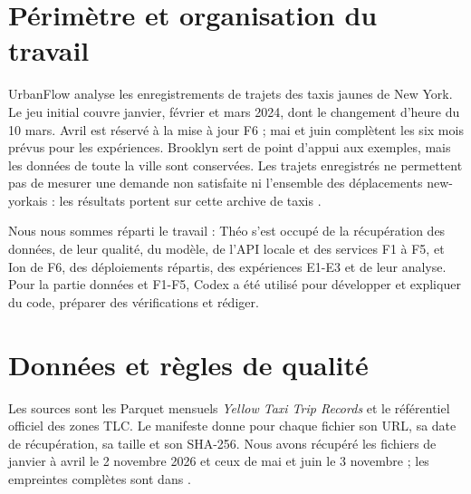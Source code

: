 \section{Périmètre et organisation du travail}
UrbanFlow analyse les enregistrements de trajets des taxis jaunes de New York.
Le jeu initial couvre janvier, février et mars 2024, dont le changement d'heure
du 10 mars. Avril est réservé à la mise à jour F6 ; mai et juin complètent les
six mois prévus pour les expériences. Brooklyn sert de point d'appui aux exemples,
mais les données de toute la ville sont conservées. Les trajets enregistrés ne
permettent pas de mesurer une demande non satisfaite ni l'ensemble des déplacements
new-yorkais : les résultats portent sur cette archive de taxis \cite{sujet}.

Nous nous sommes réparti le travail : Théo s'est occupé de la récupération des données, de leur qualité, du modèle, de l'API locale et des services F1 à F5, et Ion de F6, des déploiements répartis, des expériences E1-E3 et de leur analyse. Pour la partie données et F1-F5, 
Codex a été utilisé pour développer et expliquer du code, préparer des vérifications et
rédiger. 



\section{Données et règles de qualité}\label{sec:donnees}
Les sources sont les Parquet mensuels \emph{Yellow Taxi Trip Records} et le
référentiel officiel des zones TLC. Le manifeste donne pour chaque fichier son
URL, sa date de récupération, sa taille et son SHA-256. Nous avons récupéré les fichiers de janvier à avril le 2 novembre 2026 et ceux de mai et juin le 3 novembre ;
les empreintes complètes sont dans  \cite{tlc,preuves}.


